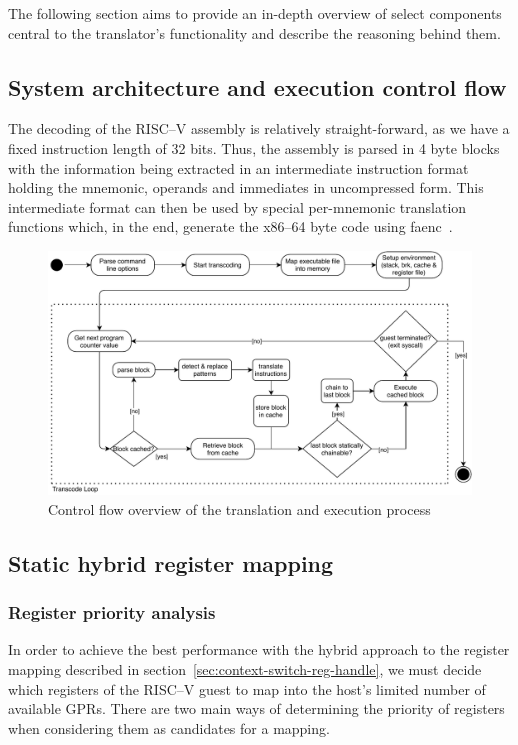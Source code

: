 The following section aims to provide an in-depth overview of select components central to the translator's functionality and describe the reasoning behind them.

\subsection{System architecture and execution control flow}
The decoding of the RISC--V assembly is relatively straight-forward, as we have a fixed instruction length of 32 bits.
Thus, the assembly is parsed in 4 byte blocks with the information being extracted in an intermediate instruction format holding the mnemonic, operands and immediates in uncompressed form.
This intermediate format can then be used by special per-mnemonic translation functions which, in the end, generate the x86--64 byte code using faenc~\cite{faenc}.

\begin{figure}[h]
	\begin{center}
		\includegraphics[width=\textwidth]{media/strategy.pdf}
		\caption{Control flow overview of the translation and execution process}
	\end{center}
\end{figure}



\subsection{Static hybrid register mapping}
\subsubsection{Register priority analysis}
In order to achieve the best performance with the hybrid approach to the register mapping described in section~\vref{sec:context-switch-reg-handle}, we must decide which registers of the RISC--V guest to map into the host's limited number of available GPRs.
There are two main ways of determining the priority of registers when considering them as candidates for a mapping.

